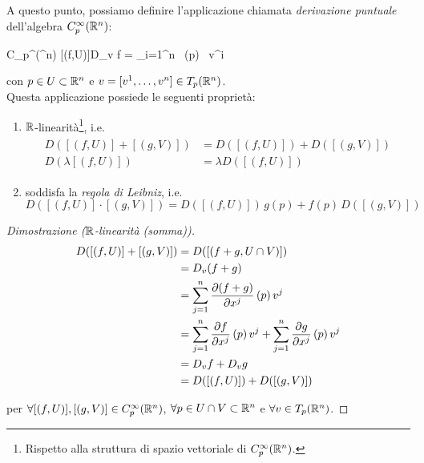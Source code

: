 A questo punto, possiamo definire l'applicazione chiamata \textit{derivazione puntuale} dell'algebra $ C_{p}^{\infty}(\mathbb{R}^{n}) $:

%
	{C_{p}^{\infty}(\R^{n})}{\R}%
	{[(f,U)]}{D_{v} f = \sum_{i=1}^{n}  \, (p) \, v^{i}}

con $ p \in U \subset \mathbb{R}^{n} $ e $ v = [v^{1}, \dots, v^{n}] \in T_{p} (\mathbb{R}^{n}) $.\\
Questa applicazione possiede le seguenti proprietà:

\begin{enumerate}
	\item $ \mathbb{R} $-linearità\footnote{%
		Rispetto alla struttura di spazio vettoriale di $ C_{p}^{\infty}(\mathbb{R}^{n}) $.%
	}, i.e.
		\begin{align}
			\begin{split}
				D ([(f,U)] + [(g,V)]) &= D ([(f,U)]) + D ([(g,V)])\\
				D (\lambda [(f,U)]) &= \lambda D ([(f,U)])
			\end{split}
		\end{align}
	
	\item soddisfa la \textit{regola di Leibniz}, i.e.
		\begin{equation}
			D ([(f,U)] \cdot [(g,V)]) = D ([(f,U)]) \, g(p) + f(p) \, D ([(g,V)])
		\end{equation}
\end{enumerate}

\begin{proof}[Dimostrazione ($ \mathbb{R} $-linearità (somma))]
	\begin{align}
		\begin{split}
			D ([(f,U)] + [(g,V)]) &= D ([(f+g,U \cap V)])\\
			&= D_{v} (f+g)\\
			&= \sum_{j=1}^{n} \pdv{(f+g)}{x^{j}} \, (p) \, v^{j}\\
			&= \sum_{j=1}^{n} \pdv{f}{x^{j}} \, (p) \, v^{j} + \sum_{j=1}^{n} \pdv{g}{x^{j}} \, (p) \, v^{j}\\
			&= D_{v} f + D_{v} g\\
			&= D ([(f,U)]) + D ([(g,V)])
		\end{split}
	\end{align}

	per $ \forall [(f,U)], [(g,V)] \in C_{p}^{\infty}(\mathbb{R}^{n}) $, $ \forall p \in U \cap V \subset \mathbb{R}^{n} $ e $ \forall v \in T_{p} (\mathbb{R}^{n}) $.
\end{proof}

